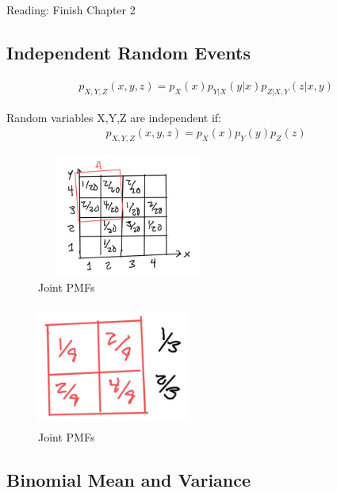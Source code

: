
 Reading: Finish Chapter 2

\subsection{Independent Random Events}


\begin{align*}
p_{X,Y,Z}(x,y,z)=p_X(x)p_{Y|X}(y|x)p_{Z|X,Y}(z|x,y)
\end{align*}

Random variables X,Y,Z are independent if:
\begin{align*}
p_{X,Y,Z}(x,y,z)=p_X(x)p_{Y}(y)p_{Z}(z)
\end{align*}

\begin{figure}[ht]
\centering
\includegraphics[width=6cm, height=4cm]{images/L07/IMG_1544.jpeg}
\caption{Joint PMFs}
\end{figure}

\begin{figure}[ht]
\centering
\includegraphics[width=5cm, height=4cm]{images/L07/IMG_1545.jpeg}
\caption{Joint PMFs}
\end{figure}



\subsection{Binomial Mean and Variance}


